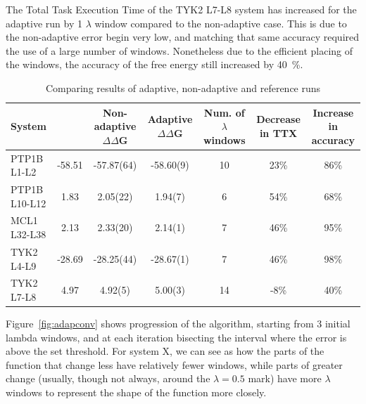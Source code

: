 The Total Task Execution Time of the TYK2 L7-L8 system has increased for the
adaptive run by 1 $\lambda$ window compared to the non-adaptive case. This is
due to the non-adaptive error begin very low, and matching that same accuracy
required the use of a large number of windows. Nonetheless due to the
efficient placing of the windows, the accuracy of the free energy still
increased by \SI{40}{\percent}.

\begin{table}
  \caption{Comparing results of adaptive, non-adaptive and reference runs}
  \label{tab:adapquad}
  \begin{tabular}{lSSSSS[table-format=5.1]S[table-format=5.1]}
    \toprule
    {System}                               & 
    {}  &
    {Non-adaptive $\Delta \Delta$G}        &
    {Adaptive $\Delta \Delta$G}            &
    {Num. of $\lambda$ windows}            &
    {Decrease in TTX}       &
    {Increase in accuracy}                 \\
    \midrule
    {PTP1B L1-L2}   & 
    -58.51 & 
    -57.87(64) & 
    -58.60(9) & 
    10 & 
    23\si{\percent} & 
    86\si{\percent} \\
    {PTP1B L10-L12} & 
    1.83   & 
    2.05(22) & 
    1.94(7)  & 
    6  & 
    54\si{\percent} &
    68\si{\percent} \\
    {MCL1  L32-L38} & 
    2.13   & 
    2.33(20) & 
    2.14(1)      & 
    7  & 
    46\si{\percent} & 
    95\si{\percent} \\
    {TYK2  L4-L9}   &
    -28.69 & 
    -28.25(44) & 
    -28.67(1)  & 
    7  & 
    46\si{\percent} & 
    98\si{\percent} \\
    {TYK2  L7-L8}   & 
    4.97   & 
    4.92(5) & 
    5.00(3)      & 
    14 &  
    -8\si{\percent} & 
    40\si{\percent} \\
    \bottomrule 
    
  \end{tabular}
\end{table}

Figure~\ref{fig:adapconv} shows progression of the algorithm, starting from 3
initial lambda windows, and at each iteration bisecting the interval where
the error is above the set threshold. For system X, we can see as how the
parts of the function that change less have relatively fewer windows, while
parts of greater change (usually, though not always, around the $\lambda=0.5$
mark) have more $\lambda$ windows to represent the shape of the function more
closely.

